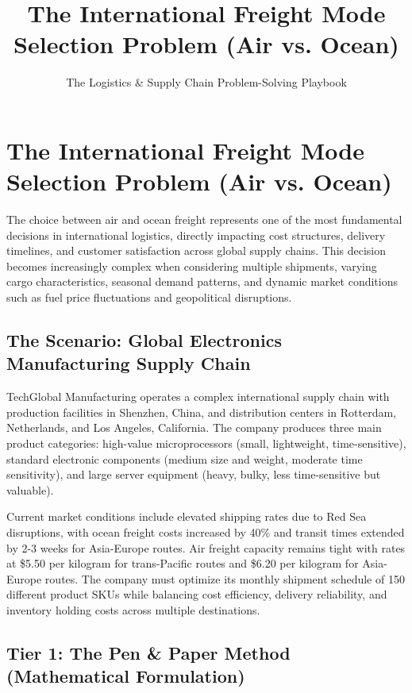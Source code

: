 \documentclass{article}
\title{The International Freight Mode Selection Problem (Air vs. Ocean)}
\author{The Logistics \& Supply Chain Problem-Solving Playbook}
\date{}
\begin{document}
\maketitle

\section{The International Freight Mode Selection Problem (Air vs. Ocean)}

The choice between air and ocean freight represents one of the most fundamental decisions in international logistics, directly impacting cost structures, delivery timelines, and customer satisfaction across global supply chains. This decision becomes increasingly complex when considering multiple shipments, varying cargo characteristics, seasonal demand patterns, and dynamic market conditions such as fuel price fluctuations and geopolitical disruptions.

\subsection{The Scenario: Global Electronics Manufacturing Supply Chain}

TechGlobal Manufacturing operates a complex international supply chain with production facilities in Shenzhen, China, and distribution centers in Rotterdam, Netherlands, and Los Angeles, California. The company produces three main product categories: high-value microprocessors (small, lightweight, time-sensitive), standard electronic components (medium size and weight, moderate time sensitivity), and large server equipment (heavy, bulky, less time-sensitive but valuable).

Current market conditions include elevated shipping rates due to Red Sea disruptions, with ocean freight costs increased by 40\% and transit times extended by 2-3 weeks for Asia-Europe routes. Air freight capacity remains tight with rates at \$5.50 per kilogram for trans-Pacific routes and \$6.20 per kilogram for Asia-Europe routes. The company must optimize its monthly shipment schedule of 150 different product SKUs while balancing cost efficiency, delivery reliability, and inventory holding costs across multiple destinations.

\subsection{Tier 1: The Pen \& Paper Method (Mathematical Formulation)}
\end{document}
